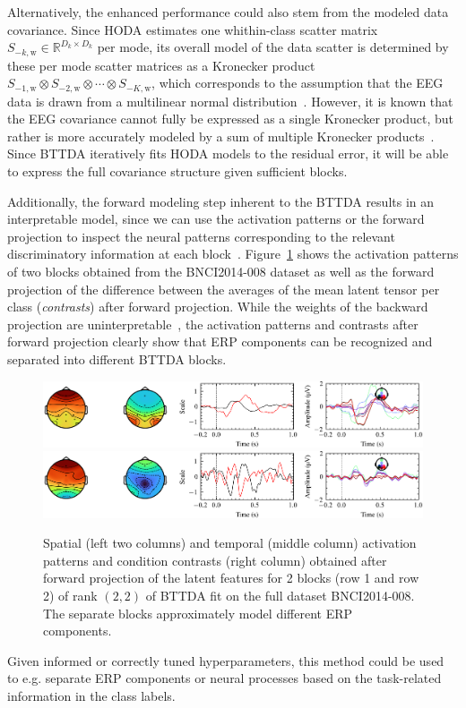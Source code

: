 Alternatively, the enhanced performance could also stem from the modeled data
covariance.
Since HODA estimates one whithin-class scatter matrix
$S_{-k,\text{w}}\in\mathbb{R}^{D_k\times D_k}$ per mode, its overall
model of the data scatter is determined by these per mode scatter matrices as a
Kronecker product $S_{-1,\text{w}}\otimes S_{-2,\text{w}}\otimes\cdots\otimes S_{-K,\text{w}}$, which corresponds to the assumption that the EEG data is
drawn from a multilinear normal distribution~\cite{Ohlson2013}.
However, it is known that the EEG covariance cannot fully be expressed as a
single Kronecker product, but rather is more accurately modeled by a sum of
multiple Kronecker products~\cite{Bijma2005, Sosulski2022}.
Since BTTDA iteratively fits HODA models to the residual error, it will be able
to express the full covariance structure given sufficient blocks.

Additionally, the forward modeling step inherent to the BTTDA results
in an interpretable model, since we can use the activation patterns or the
forward projection to inspect the neural patterns corresponding to the
relevant discriminatory information at each block~\cite{Haufe2014}.
Figure~\ref{fig:forward} shows the activation patterns
of two blocks obtained from the BNCI2014-008 dataset as well as the forward
projection of the difference between the averages of the mean latent tensor per
class (\emph{contrasts}) after forward projection.
While the weights of the backward projection are
uninterpretable~\cite{Haufe2014},
the activation patterns and contrasts after forward projection clearly show
that ERP components can be recognized and separated into different
BTTDA blocks.
\begin{figure}[t]
	\includegraphics[width=\linewidth]{figures/bttda/forward_block-0.png}
	\includegraphics[width=\linewidth]{figures/bttda/forward_block-1.png}
  \caption[Extracted \ac{bttda} activation patterns.]{%
    Spatial (left two columns) and temporal (middle column) activation patterns and
		condition contrasts (right column) obtained after forward projection of the latent
		features for 2 blocks (row 1 and row 2) of rank $(2,2)$ of BTTDA
		fit on the full dataset BNCI2014-008.
		The separate blocks approximately model different ERP
		components.}
	\label{fig:forward}
\end{figure}
Given informed or correctly tuned hyperparameters, this method could be used to
e.g. separate ERP components or neural processes based on the task-related
information in the class labels.

